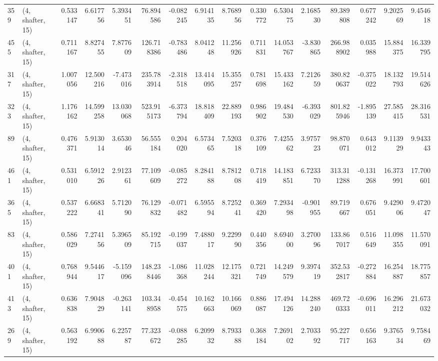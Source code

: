 \begin{tabular}{llrrrrrrrrrrrrrr}
359 &  (4, shafter, 15) &   0.533147 &   6.617756 &   5.393451 &    76.894586 &  -0.082245 &   6.914135 &   8.768956 &  0.330772 &   6.530475 &   2.168530 &     89.389808 &    0.677242 &    9.202569 &    9.454618 \\
455 &  (4, shafter, 15) &   0.711167 &   8.827455 &   7.877609 &   126.718386 &  -0.783486 &   8.041248 &  11.256926 &  0.711831 &  14.053767 &  -3.830865 &    266.988902 &    0.035988 &   15.884375 &   16.339795 \\
317 &  (4, shafter, 15) &   1.007056 &  12.500216 &  -7.473016 &   235.783914 &  -2.318518 &  13.414095 &  15.355257 &  0.781698 &  15.433162 &   7.212659 &    380.820637 &   -0.375022 &   18.132793 &   19.514626 \\
323 &  (4, shafter, 15) &   1.176162 &  14.599258 &  13.030068 &   523.915173 &  -6.373794 &  18.818409 &  22.889193 &  0.986902 &  19.484530 &  -6.393029 &    801.825946 &   -1.895139 &   27.585415 &   28.316531 \\
89  &  (4, shafter, 15) &   0.476371 &   5.913014 &   3.653046 &    56.555184 &   0.204020 &   6.573465 &   7.520318 &  0.376109 &   7.425562 &   3.975723 &     98.870071 &    0.643012 &    9.113929 &    9.943343 \\
461 &  (4, shafter, 15) &   0.531010 &   6.591226 &   2.912361 &    77.109609 &  -0.085272 &   8.284188 &   8.781208 &  0.718419 &  14.183851 &   6.723370 &    313.311288 &   -0.131268 &   16.373991 &   17.700601 \\
365 &  (4, shafter, 15) &   0.537222 &   6.668341 &   5.712090 &    76.129832 &  -0.071482 &   6.595594 &   8.725241 &  0.369420 &   7.293498 &  -0.901955 &     89.719667 &    0.676051 &    9.429006 &    9.472047 \\
83  &  (4, shafter, 15) &   0.586029 &   7.274156 &   5.396509 &    85.192715 &  -0.199037 &   7.488017 &   9.229990 &  0.440356 &   8.694000 &   3.270096 &    133.867017 &    0.516649 &   11.098355 &   11.570091 \\
401 &  (4, shafter, 15) &   0.768944 &   9.544617 &  -5.159096 &   148.238446 &  -1.086368 &  11.028244 &  12.175321 &  0.721749 &  14.249579 &   9.397419 &    352.532817 &   -0.272884 &   16.254887 &   18.775857 \\
413 &  (4, shafter, 15) &   0.636838 &   7.904829 &  -0.263141 &   103.348958 &  -0.454575 &  10.162663 &  10.166069 &  0.886087 &  17.494126 &  14.288240 &    469.720333 &   -0.696011 &   16.296212 &   21.673032 \\
269 &  (4, shafter, 15) &   0.563192 &   6.990688 &   6.225787 &    77.323672 &  -0.088285 &   6.209932 &   8.793388 &  0.368184 &   7.269102 &   2.703392 &     95.227717 &    0.656163 &    9.376534 &    9.758469 \\

\end{tabular}

